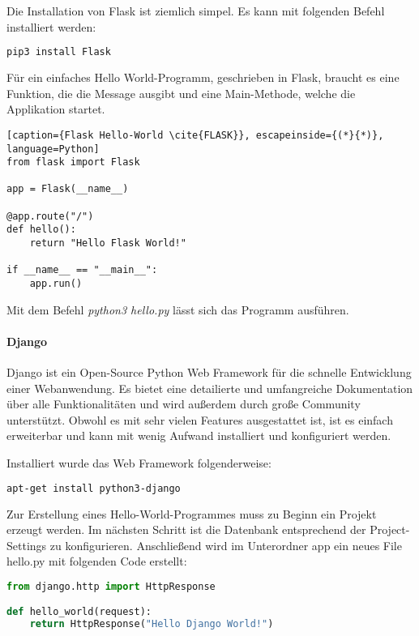 Die Installation von Flask ist ziemlich simpel. Es kann mit folgenden Befehl installiert werden:
\begin{lstlisting}[caption={Installation von Flask \cite{FLASK}}, language=bash]
pip3 install Flask
\end{lstlisting}

Für ein einfaches \grqq{}Hello World\grqq{}-Programm, geschrieben in Flask, braucht es eine Funktion, die die Message ausgibt und eine Main-Methode, welche die Applikation startet.

\begin{lstlisting}[caption={Flask Hello-World \cite{FLASK}}, escapeinside={(*}{*)}, language=Python]
from flask import Flask

app = Flask(__name__)

@app.route("/")
def hello():
	return "Hello Flask World!"

if __name__ == "__main__":
    app.run()
\end{lstlisting}

Mit dem Befehl \textit{python3 hello.py} lässt sich das Programm ausführen.

\paragraph{Django}
Django ist ein Open-Source Python Web Framework für die schnelle Entwicklung einer Webanwendung. Es bietet eine detailierte und umfangreiche Dokumentation über alle Funktionalitäten und wird außerdem durch große Community unterstützt. Obwohl es mit sehr vielen Features ausgestattet ist, ist es einfach erweiterbar und kann mit wenig Aufwand installiert und konfiguriert werden.\cite{DJANGO}

Installiert wurde das Web Framework folgenderweise:
\begin{lstlisting}[caption={Installation von Django\cite{DJANGOIN}}, language=bash]
apt-get install python3-django
\end{lstlisting}

Zur Erstellung eines \grqq{}Hello-World\grqq{}-Programmes muss zu Beginn ein Projekt erzeugt werden. Im nächsten Schritt ist die Datenbank entsprechend der Project-Settings zu konfigurieren. Anschließend wird im Unterordner app ein neues File \grqq{}hello.py\grqq{} mit folgenden Code erstellt:

\begin{lstlisting}[caption={Django Hello-World \cite{DJANGOCODE}}, language=Python]
from django.http import HttpResponse

def hello_world(request):
	return HttpResponse("Hello Django World!")
\end{lstlisting}

